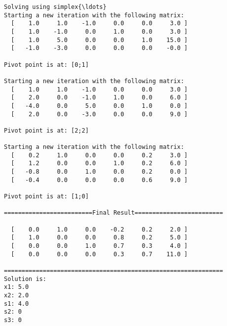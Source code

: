 \documentclass[11pt]{article}
\begin{document}
    \begin{Verbatim}[commandchars=\\\{\}]
Solving using simplex{\ldots}
Starting a new iteration with the following matrix:
  [    1.0     1.0    -1.0     0.0     0.0     3.0 ]
  [    1.0    -1.0     0.0     1.0     0.0     3.0 ]
  [    1.0     5.0     0.0     0.0     1.0    15.0 ]
  [   -1.0    -3.0     0.0     0.0     0.0    -0.0 ]

Pivot point is at: [0;1]

Starting a new iteration with the following matrix:
  [    1.0     1.0    -1.0     0.0     0.0     3.0 ]
  [    2.0     0.0    -1.0     1.0     0.0     6.0 ]
  [   -4.0     0.0     5.0     0.0     1.0     0.0 ]
  [    2.0     0.0    -3.0     0.0     0.0     9.0 ]

Pivot point is at: [2;2]

Starting a new iteration with the following matrix:
  [    0.2     1.0     0.0     0.0     0.2     3.0 ]
  [    1.2     0.0     0.0     1.0     0.2     6.0 ]
  [   -0.8     0.0     1.0     0.0     0.2     0.0 ]
  [   -0.4     0.0     0.0     0.0     0.6     9.0 ]

Pivot point is at: [1;0]

=========================Final Result=========================

  [    0.0     1.0     0.0    -0.2     0.2     2.0 ]
  [    1.0     0.0     0.0     0.8     0.2     5.0 ]
  [    0.0     0.0     1.0     0.7     0.3     4.0 ]
  [    0.0     0.0     0.0     0.3     0.7    11.0 ]

==============================================================
Solution is:
x1: 5.0
x2: 2.0
s1: 4.0
s2: 0
s3: 0
    \end{Verbatim}


    
    
    
\end{document}
